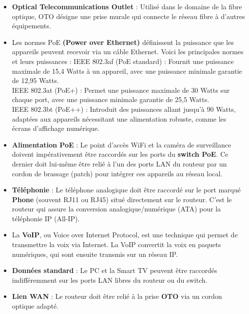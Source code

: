 \documentclass[a4paper,12pt,answers,addpoints]{exam}
\begin{document}
\begin{questions}
\begin{solution}
\begin{itemize}
	\item \textbf{Optical Telecommunications Outlet} : Utilisé dans le domaine de la fibre optique, OTO désigne une prise murale qui connecte le réseau fibre à d'autres équipements.
    \item Les normes PoE \textbf{(Power over Ethernet)} définissent la puissance que les appareils peuvent recevoir via un câble Ethernet. Voici les principales normes et leurs puissances :
    IEEE 802.3af (PoE standard) : Fournit une puissance maximale de 15,4 Watts à un appareil, avec une puissance minimale garantie de 12,95 Watts.\\
    IEEE 802.3at (PoE+) : Permet une puissance maximale de 30 Watts sur chaque port, avec une puissance minimale garantie de 25,5 Watts.\\
    IEEE 802.3bt (PoE++) : Introduit des puissances allant jusqu'à 90 Watts, adaptées aux appareils nécessitant une alimentation robuste, comme les écrans d'affichage numérique.

    \item \textbf{Alimentation PoE} : Le point d'accès WiFi et la caméra de surveillance doivent impérativement être raccordés sur les ports du \textbf{switch PoE}. Ce dernier doit lui-même être relié à l'un des ports LAN du routeur par un cordon de brassage (patch) pour intégrer ces appareils au réseau local.
        
    \item \textbf{Téléphonie} : Le téléphone analogique doit être raccordé sur le port marqué \textbf{Phone} (souvent RJ11 ou RJ45) situé directement sur le routeur. C'est le routeur qui assure la conversion analogique/numérique (ATA) pour la téléphonie IP (All-IP).
    \item La \textbf{VoIP}, ou Voice over Internet Protocol, est une technique qui permet de transmettre la voix via Internet. La VoIP convertit la voix en paquets numériques, qui sont ensuite transmis sur un réseau IP.    
    \item \textbf{Données standard} : Le PC et la Smart TV peuvent être raccordés indifféremment sur les ports LAN libres du routeur ou du switch.
    \item \textbf{Lien WAN} : Le routeur doit être relié à la prise \textbf{OTO} via un cordon optique adapté.
\end{itemize}


\end{solution}
\end{questions}
\end{document}
